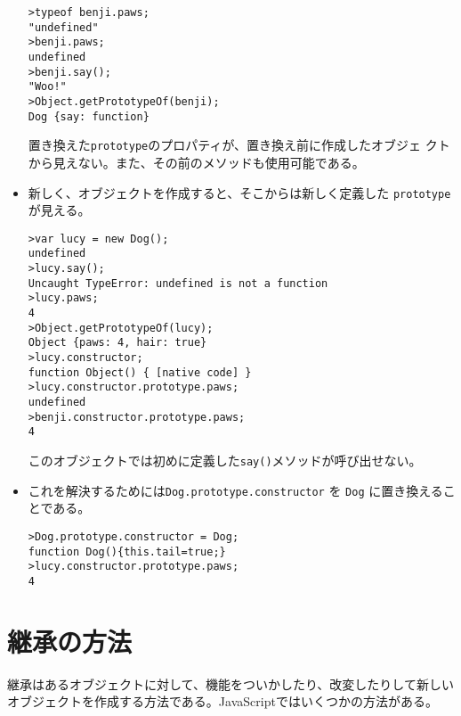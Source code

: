 \begin{Exec}
\begin{itemize}
\begin{verbatim}
>typeof benji.paws;
"undefined"
>benji.paws;
undefined
>benji.say();
"Woo!"
>Object.getPrototypeOf(benji);
Dog {say: function}
\end{verbatim}
置き換えた\texttt{prototype}のプロパティが、置き換え前に作成したオブジェ
       クトから見えない。また、その前のメソッドも使用可能である。
 \item 新しく、オブジェクトを作成すると、そこからは新しく定義した
       \texttt{prototype}が見える。
\begin{verbatim}
>var lucy = new Dog();
undefined
>lucy.say();
Uncaught TypeError: undefined is not a function
>lucy.paws;
4
>Object.getPrototypeOf(lucy);
Object {paws: 4, hair: true}
>lucy.constructor;
function Object() { [native code] }
>lucy.constructor.prototype.paws;
undefined
>benji.constructor.prototype.paws;
4
\end{verbatim}
このオブジェクトでは初めに定義した\texttt{say()}メソッドが呼び出せない。
 \item これを解決するためには\texttt{Dog.prototype.constructor} を
       \texttt{Dog} に置き換えることである。
\begin{verbatim}
>Dog.prototype.constructor = Dog;
function Dog(){this.tail=true;}
>lucy.constructor.prototype.paws;
4
\end{verbatim}
\end{itemize}
\end{Exec}
%
\section{継承の方法}
継承はあるオブジェクトに対して、機能をついかしたり、改変したりして新しい
オブジェクトを作成する方法である。JavaScriptではいくつかの方法がある。
